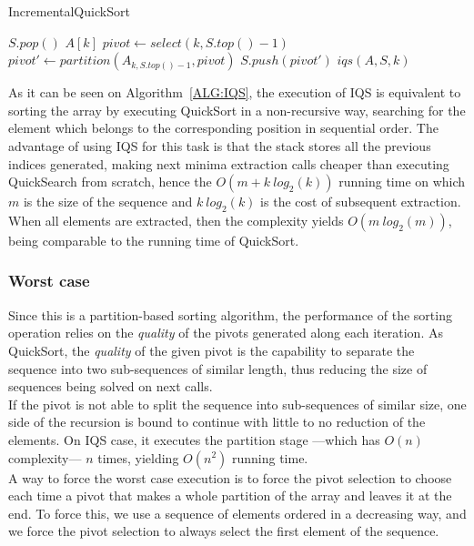 \begin{algorithm}
  \caption{IncrementalQuickSort}\label{ALG:IQS}
  \begin{algorithmic}[1]
    \State $S.pop()$
    \Return $A[k]$
    \EndIf
    \State $pivot \gets select(k, S.top()-1)$
    \State $pivot' \gets partition(A_{k, S.top()-1},pivot)$
    \State $S.push(pivot')$
    \State \Return $iqs(A,S,k)$
    \EndProcedure
  \end{algorithmic}
\end{algorithm}

As it can be seen on Algorithm~\ref{ALG:IQS}, the execution of IQS is equivalent to sorting the array by executing QuickSort in a non-recursive way, searching for the element which belongs to the corresponding position in sequential order. The advantage of using IQS for this task is that the stack stores all the previous indices generated, making next minima extraction calls cheaper than executing QuickSearch from scratch, hence the $O(m + k~log_2(k) ) $ running time on which $m$ is the size of the sequence and $k~log_2(k)$ is the cost of subsequent extraction. When all elements are extracted, then the complexity yields $O(m\ log_2(m))$, being comparable to the running time of QuickSort.\\

\subsubsection{Worst case}
Since this is a partition-based sorting algorithm, the performance of the sorting operation relies on the \textit{quality} of the pivots generated along each iteration. As QuickSort, the \textit{quality} of the given pivot is the capability to separate the sequence into two sub-sequences of similar length, thus reducing the size of sequences being solved on next calls.\\

If the pivot is not able to split the sequence into sub-sequences of similar size, one side of the recursion is bound to continue with little to no reduction of the elements. On IQS case, it executes the partition stage ---which has $O(n)$ complexity--- $n$ times, yielding $O(n^2)$ running time.\\

A way to force the worst case execution is to force the pivot selection to choose each time a pivot that makes a whole partition of the array and leaves it at the end. To force this, we use a sequence of elements ordered in a decreasing way, and we force the pivot selection to always select the first element of the sequence.\\

